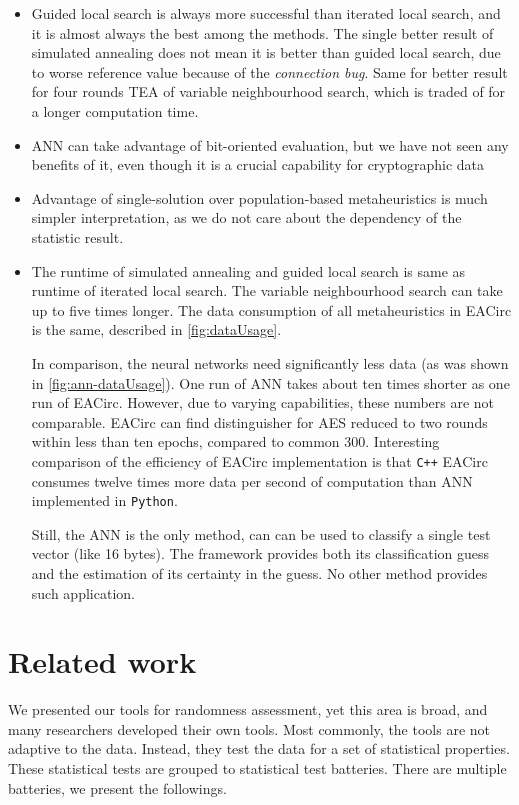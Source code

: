 \documentclass[
  print, %
  Table,   %
  nolof,     %
  nolot,     %
  11pt, %
  oneside  %
]{fithesis3}
\begin{document}
\begin{itemize}
    \item Guided local search is always more successful than iterated local search, and it is almost always the best among the methods. The single better result of simulated annealing does not mean it is better than guided local search, due to worse reference value because of the \textit{connection bug}. Same for better result for four rounds TEA of variable neighbourhood search, which is traded of for a longer computation time.
    \item ANN can take advantage of bit-oriented evaluation, but we have not seen any benefits of it, even though it is a crucial capability for cryptographic data
    \item Advantage of single-solution over population-based metaheuristics is much simpler interpretation, as we do not care about the dependency of the statistic result.
    \item The runtime of simulated annealing and guided local search is same as runtime of iterated local search. The variable neighbourhood search can take up to five times longer. The data consumption of all metaheuristics in EACirc is the same, described in \cref{fig:dataUsage}.
    
    In comparison, the neural networks need significantly less data (as was shown in \cref{fig:ann-dataUsage}). One run of ANN takes about ten times shorter as one run of EACirc. However, due to varying capabilities, these numbers are not comparable. EACirc can find distinguisher for AES reduced to two rounds within less than ten epochs, compared to common 300. Interesting comparison of the efficiency of EACirc implementation is that \texttt{C++} EACirc consumes twelve times more data per second of computation than ANN implemented in \texttt{Python}.
    
    Still, the ANN is the only method, can can be used to classify a single test vector (like 16 bytes). The framework provides both its classification guess and the estimation of its certainty in the guess. No other method provides such application.
\end{itemize}

\chapter{Related work}
\label{chap:relatwork}

We presented our tools for randomness assessment, yet this area is broad, and many researchers developed their own tools. Most commonly, the tools are not adaptive to the data. Instead, they test the data for a set of statistical properties. These statistical tests are grouped to statistical test batteries. There are multiple batteries, we present the followings.
\end{document}
